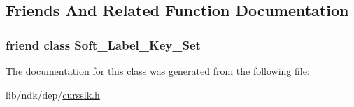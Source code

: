 \subsection{Friends And Related Function Documentation}
\hypertarget{class_soft___label___key___set_1_1_soft___label___key_a8e39446724f3cd921201caaba1941197}{
\subsubsection[{Soft\-\_\-\-Label\-\_\-\-Key\-\_\-\-Set}]{\setlength{\rightskip}{0pt plus 5cm}friend class {\bf Soft\-\_\-\-Label\-\_\-\-Key\-\_\-\-Set}\hspace{0.3cm}{\ttfamily [friend]}}}\label{class_soft___label___key___set_1_1_soft___label___key_a8e39446724f3cd921201caaba1941197}


The documentation for this class was generated from the following file\-:\begin{DoxyCompactItemize}
\item 
lib/ndk/dep/\hyperlink{cursslk_8h}{cursslk.\-h}\end{DoxyCompactItemize}
